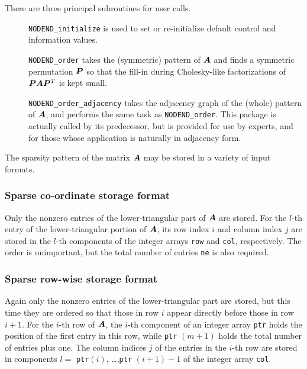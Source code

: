 \documentclass{galahad}
\newcommand{\packagename}{NODEND}
\begin{document}
\noindent There are three principal subroutines for user calls.

\begin{description}
\item[]{\tt \packagename\_initialize} is used to set or re-initialize 
 default control and information values.

\item[] {\tt \packagename\_order} takes the (symmetric) pattern of ${\bm{A}}$
 and finds a symmetric permutation ${\bm{P}}$ so that the fill-in
 during Cholesky-like factorizations of ${\bm{P}} {\bm{A}} {\bm{P}}^T$
 is kept small.

\item[] {\tt \packagename\_order\_adjacency} takes the adjacency graph of 
 the (whole) pattern of ${\bm{A}}$, and performs the same task as
 {\tt \packagename\_order}. This package is actually called
 by its predecessor, but is provided for use by experts, and for
 those whose application is naturally in adjacency form.
\end{description}


\galmatrix
The sparsity pattern of the matrix ${\bm{A}}$ may be stored in 
a variety of input formats.

\subsubsection{Sparse co-ordinate storage format}\label{coordinate}
Only the nonzero entries of the lower-triangular part of ${\bm{A}}$ are stored.
For the $l$-th entry of the lower-triangular portion of ${\bm{A}}$,
its row index $i$ and column index $j$
are stored in the $l$-th components of the integer arrays 
{\tt row} and {\tt col}, respectively.
The order is unimportant, but the total number of entries
{\tt ne} is also required.

\subsubsection{Sparse row-wise storage format}\label{rowwise}
Again only the nonzero entries of the lower-triangular part are stored,
but this time they are ordered so that those in row $i$ appear directly
before those in row $i+1$. For the $i$-th row of ${\bm{A}}$, the $i$-th component
of an integer array {\tt ptr} holds the position of the first entry in this row,
while {\tt ptr} $(m+1)$ holds the total number of entries plus one.
The column indices $j$ of the entries in the $i$-th row are 
stored in components $l =$ {\tt ptr}$(i)$, \ldots ,{\tt ptr} $(i+1)-1$ 
of the integer array {\tt col}.
\end{document}
